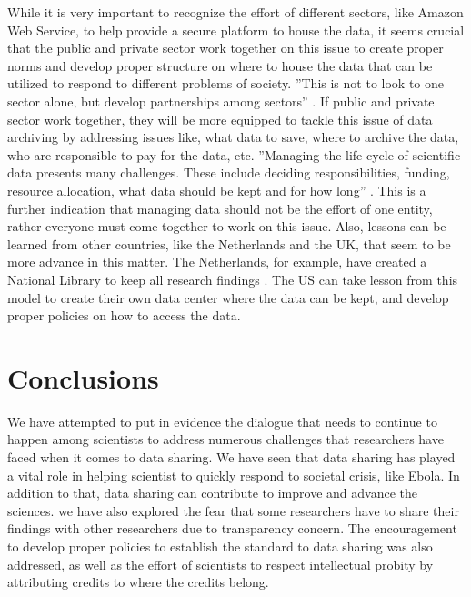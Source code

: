 \documentclass[sigconf]{acmart}
\begin{document}
While it is very important to recognize the effort of different sectors, like Amazon Web Service, to help provide a secure platform to house the data, it seems crucial that the public and private sector work together on this issue to create proper norms and develop proper structure on where to house the data that can be utilized to respond to different problems of society. ''This is not to look to one sector alone, but develop partnerships among sectors'' \cite{berman2013will}. If public and private sector work together, they will be more equipped to tackle this issue of data archiving by addressing issues like, what data to save, where to archive the data, who are responsible to pay for the data, etc. ''Managing the life cycle of scientific data presents many challenges. These include deciding responsibilities, funding, resource allocation, what data should be kept and for how long'' \cite{lynch2008big}. This is a further indication that managing data should not be the effort of one entity, rather everyone must come together to work on this issue. Also, lessons can be learned from other countries, like the Netherlands and the UK, that seem to be more advance in this matter. The Netherlands, for example, have created a National Library to keep all research findings \cite{sarkol2016scientific}. The US can take lesson from this model to create their own data center where the data can be kept, and develop proper policies on how to access the data.



\section{Conclusions}

We have attempted to put in evidence the dialogue that needs to continue to happen among scientists to address numerous challenges that researchers have faced when it comes to data sharing. We have seen that data sharing has played a vital role in helping scientist to quickly respond to societal crisis, like Ebola. In addition to that, data sharing can contribute to improve and advance the sciences. we have also explored the fear that some researchers have to share their findings with other researchers due to transparency concern. The encouragement to develop proper policies to establish the standard to data sharing was also addressed, as well as the effort of scientists to respect intellectual probity by attributing credits to where the credits belong. 




 
\end{document}
